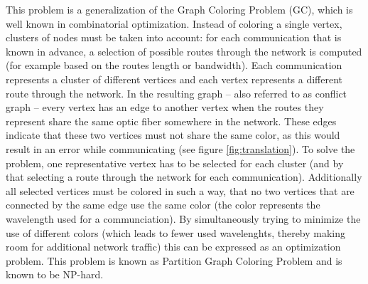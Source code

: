 \documentclass[paper = a4, fontsize = 10pt]{scrartcl}
\begin{document}

This problem is a generalization of the Graph Coloring Problem (GC), which is well known in combinatorial optimization. Instead of coloring a single vertex, clusters of nodes must be taken into account: for each communication that is known in advance, a selection of possible routes through the network is computed (for example based on the routes length or bandwidth). Each communication represents a cluster of different vertices and each vertex represents a different route through the network. In the resulting graph -- also referred to as conflict graph -- every vertex has an edge to another vertex when the routes they represent share the same optic fiber somewhere in the network. These edges indicate that these two vertices must not share the same color, as this would result in an error while communicating (see figure \ref{fig:translation}). To solve the problem, one representative vertex has to be selected for each cluster (and by that selecting a route through the network for each communication). Additionally all selected vertices must be colored in such a way, that no two vertices that are connected by the same edge use the same color (the color represents the wavelength used for a communciation). By simultaneously trying to minimize the use of different colors (which leads to fewer used wavelenghts, thereby making room for additional network traffic) this can be expressed as  an optimization problem. This problem is known as Partition Graph Coloring Problem and is known to be NP-hard.
\end{document}
